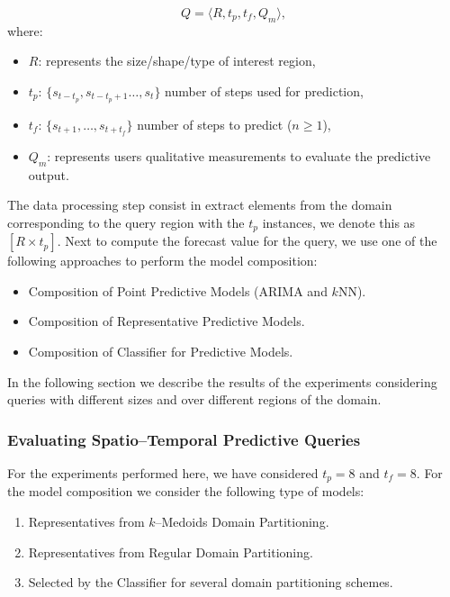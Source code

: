 \begin{equation*} 
Q = \langle R, t_{p}, t_{f}, Q_{m} \rangle,
\end{equation*}
where:
\begin{itemize}[noitemsep,nolistsep]	
	\item $R$: represents the size/shape/type of interest region,
	\item $t_{p}$: $\{s_{t-t_p}, s_{t-t_{p}+1}\ldots, s_{t}\}$ number of steps used for  prediction,
	\item $t_{f}$: $\{s_{t+1}, \ldots, s_{t+t_f}\}$ number of steps to predict ($n\geq 1$),
	\item $Q_{m}$: represents users qualitative measurements to evaluate the predictive output.
\end{itemize}

The data processing step consist in extract elements from the domain corresponding to the query region with the $t_p$ instances, we denote this as $[R \times t_{p}]$. Next to compute the forecast value for the query, we use one of the following approaches to perform the model composition:

\begin{itemize}
	\item Composition of Point Predictive Models (ARIMA and $k$NN).
	\item Composition of Representative Predictive Models.
	\item Composition of Classifier for Predictive Models.	
\end{itemize}

In the following section we describe the results of the experiments considering queries with different sizes and over different regions of the domain.

\subsubsection{Evaluating Spatio--Temporal Predictive Queries}
\label{Sec:ExperimentsQueries}

For the experiments performed here, we have considered $t_{p} = 8$ and $t_{f} = 8$. For the model composition we consider the following type of models:

\begin{enumerate}
	\item Representatives from $k$--Medoids Domain Partitioning.
	\item Representatives from Regular Domain Partitioning.
	\item Selected by the Classifier for several domain partitioning schemes.
\end{enumerate}

